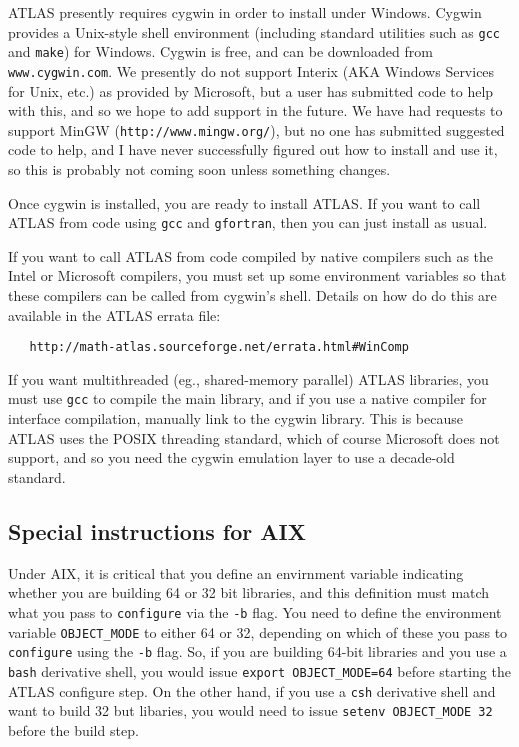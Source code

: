 \documentclass[11pt]{article}
\begin{document}
ATLAS presently requires cygwin in order to install under Windows.  Cygwin
provides a Unix-style shell environment (including standard utilities such as
{\tt gcc} and {\tt make}) for Windows.
Cygwin is free, and can be downloaded from {\tt www.cygwin.com}.  
We presently do
not support Interix (AKA Windows Services for Unix, etc.) as provided
by Microsoft, but a user has submitted code to help with this, and so
we hope to add support in the future.  We have had requests
to support MinGW (\verb|http://www.mingw.org/|), but no one has submitted
suggested code to help, and I have never successfully figured out how to
install and use it, so this is probably not coming soon unless something
changes.

Once cygwin is installed, you are ready to install ATLAS.  If you want
to call ATLAS from code using {\tt gcc} and {\tt gfortran}, then you
can just install as usual.  

If you want to call ATLAS from code compiled by native compilers such
as the Intel or Microsoft compilers, you must set up some environment
variables so that these compilers can be called from cygwin's shell.
Details on how do do this are available in the ATLAS errata file:
\vspace*{-0.1in}
\begin{verbatim}
   http://math-atlas.sourceforge.net/errata.html#WinComp
\end{verbatim}

If you want multithreaded (eg., shared-memory parallel) ATLAS libraries,
you must use {\tt gcc} to compile the main library, and if you use a native
compiler for interface compilation, manually link to the cygwin library.
This is because
ATLAS uses the POSIX threading standard, which of course Microsoft
does not support, and so you need the cygwin emulation layer to use
a decade-old standard.

\subsection{Special instructions for AIX}
Under AIX, it is critical that you define an envirnment variable
indicating whether you are building 64 or 32 bit libraries, and
this definition must match what you pass to {\tt configure} via the
{\tt -b} flag.  You need to define the environment variable
{\tt OBJECT\_MODE} to either 64 or 32, depending on which of
these you pass to {\tt configure} using the {\tt -b} flag.  So, if you
are building 64-bit libraries and you use a {\tt bash} derivative
shell, you would issue {\tt export OBJECT\_MODE=64} before starting
the ATLAS configure step.  On the other hand, if you use a {\tt csh}
derivative shell and want to build 32 but libaries, you would need
to issue {\tt setenv OBJECT\_MODE 32} before the build step.
\end{document}
